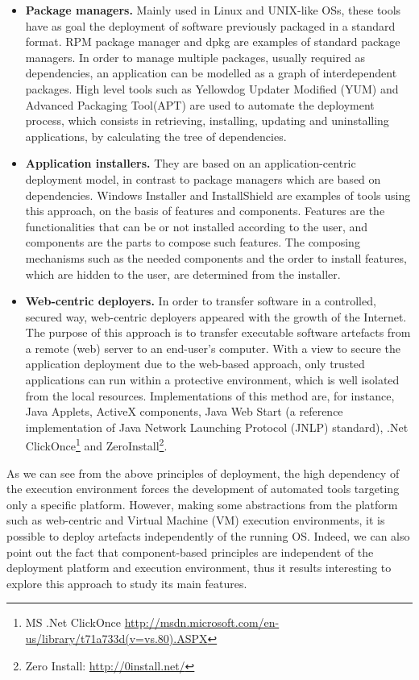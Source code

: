 \begin{itemize}
	\item \textbf{Package managers.} Mainly used in Linux and UNIX-like OSs, these tools have as goal the deployment of software previously packaged in a standard format. 
	RPM package manager \cite{bailey1997maximum} and dpkg \cite{murdock1994overview} are examples of standard package managers.
	In order to manage multiple packages, usually required as dependencies, an application can be modelled as a graph of interdependent packages.
	High level tools such as Yellowdog Updater Modified (YUM) \cite{vidalyellow} and Advanced Packaging Tool(APT) \cite{silva2001apt} are used to automate the deployment process, which consists in retrieving, installing, updating and uninstalling applications, by calculating the tree of dependencies.
	\item \textbf{Application installers.} They are based on an application-centric deployment model, in contrast to package managers which are based on dependencies.
	Windows Installer \cite{kelly1998gain} and InstallShield \cite{baker2001official} are examples of tools using this approach, on the basis of features and components.
	Features are the functionalities that can be or not installed according to the user, and components are the parts to compose such features.
	The composing mechanisms such as the needed components and the order to install features, which are hidden to the user, are determined from the installer.
	\item \textbf{Web-centric deployers.} In order to transfer software in a controlled, secured way, web-centric deployers appeared with the growth of the Internet.
	The purpose of this approach is to transfer executable software artefacts from a remote (web) server to an end-user's computer.
	With a view to secure the application deployment due to the web-based approach, only trusted applications can run within a protective environment, which is well isolated from the local resources.
	Implementations of this method are, for instance, Java Applets, ActiveX components, Java Web Start (a reference implementation of Java Network Launching Protocol (JNLP) standard), .Net ClickOnce\footnote{MS .Net ClickOnce \url{http://msdn.microsoft.com/en-us/library/t71a733d(v=vs.80).ASPX}} and ZeroInstall\footnote{Zero Install: \url{http://0install.net/}}.
\end{itemize}

As we can see from the above principles of deployment, the high dependency of the execution environment forces the development of automated tools targeting only a specific platform.
However, making some abstractions from the platform such as web-centric and Virtual Machine (VM) execution environments, it is possible to deploy artefacts independently of the running OS.
Indeed, we can also point out the fact that component-based principles are independent of the deployment platform and execution environment, thus it results interesting to explore this approach to study its main features.

